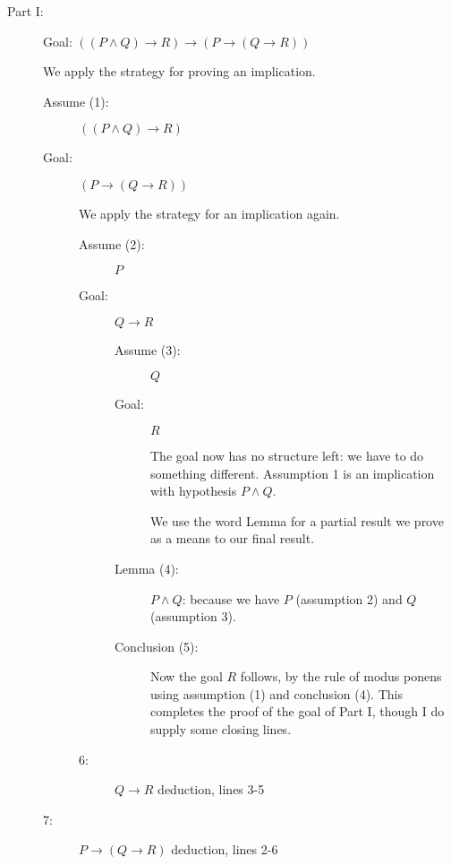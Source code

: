 \documentclass[12pt]{article}
\begin{document}
\begin{description}

\item[Part I:]  Goal:  $((P \wedge Q) \rightarrow R) \rightarrow (P \rightarrow (Q
\rightarrow R))$

We apply the strategy for proving an implication.

\begin{description}

\item[Assume (1):]  $((P \wedge Q) \rightarrow R)$

\item[Goal:]  $(P \rightarrow (Q\rightarrow R))$

We apply the strategy for an implication again.

\begin{description}

\item[Assume (2):]  $P$

\item[Goal:]  $Q \rightarrow R$

\begin{description}

\item[Assume (3):]  $Q$

\item[Goal:]  $R$

The goal now has no structure left:  we have to do something different.
Assumption 1 is an implication with hypothesis $P \wedge Q$.

We use the word Lemma for a partial result we prove as a means to our
final result.

\item[Lemma (4):] $P \wedge Q$: because we have $P$ (assumption
2) and $Q$ (assumption 3).

\item[Conclusion (5):]  Now the goal $R$ follows, by the rule of modus ponens using assumption
(1) and conclusion (4).  This completes the proof of the goal of Part I, though I do supply some closing lines.

\end{description}

\item[6:]  $Q \rightarrow R$  deduction, lines 3-5

\end{description}

\item[7:]  $P \rightarrow (Q \rightarrow R)$ deduction, lines 2-6


\end{description}
\end{description}
\end{document}
